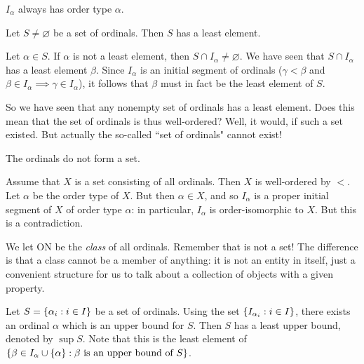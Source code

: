 \documentclass{article}
\begin{document}
\begin{corollary}
    $I_\alpha$ always has order type $\alpha$.
\end{corollary}

\begin{theorem}
    Let $S \neq \varnothing$ be a set of ordinals. Then $S$ has a least element.
\end{theorem}

\begin{prf}
    Let $\alpha \in S$. If $\alpha$ is not a least element, then $S \cap I_\alpha \neq \varnothing$. We have seen that $S \cap I_\alpha$ has a least element $\beta$. Since $I_\alpha$ is an initial segment of ordinals ($\gamma < \beta$ and $\beta \in I_\alpha \implies \gamma \in I_\alpha$), it follows that $\beta$ must in fact be the least element of $S$.
\end{prf}

So we have seen that any nonempty set of ordinals has a least element. Does this mean that the set of ordinals is thus well-ordered? Well, it would, if such a set existed. But actually the so-called ``set of ordinals" cannot exist!

\begin{theorem}
	\label{burali-forti-paradox}
    The ordinals do not form a set.
\end{theorem}

\begin{prf}
    Assume that $X$ is a set consisting of all ordinals. Then $X$ is well-ordered by $<$. Let $\alpha$ be the order type of $X$. But then $\alpha \in X$, and so $I_\alpha$ is a proper initial segment of $X$ of order type $\alpha$: in particular, $I_\alpha$ is order-isomorphic to $X$. But this is a contradiction.
\end{prf}

\begin{note}
	We let ON be the \textit{class} of all ordinals. Remember that is not a set! The difference is that a class cannot be a member of anything: it is not an entity in itself, just a convenient structure for us to talk about a collection of objects with a given property.
\end{note}

\begin{corollary}
	Let $S = \left\lbrace \alpha_i : i \in I \right\rbrace$ be a set of ordinals. Using the set $\left\lbrace I_{\alpha_i} : i \in I \right\rbrace$, there exists an ordinal $\alpha$ which is an upper bound for $S$. Then $S$ has a least upper bound, denoted by $\sup S$. Note that this is the least element of $\left\lbrace \beta \in I_\alpha \cup \left\lbrace \alpha \right\rbrace : \beta \text{ is an upper bound of } S \right\rbrace$.
\end{corollary}
\end{document}
